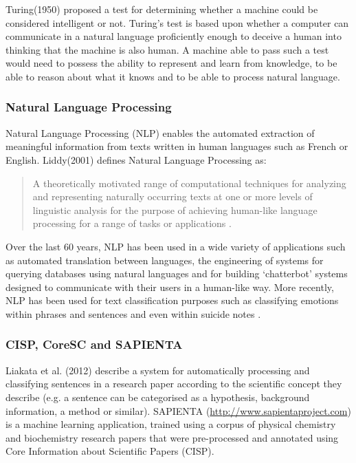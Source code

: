 \documentclass[12pt,a4paper]{article}
\begin{document}
Turing(1950) proposed a test for determining whether a machine could be
considered intelligent or not\cite{turing1950computing}. Turing's test is based
upon whether a computer can communicate in a natural language proficiently
enough to deceive a human into thinking that the machine is also human. A
machine able to pass such a test would need to possess the ability to represent
and learn from knowledge, to be able to reason about what it knows and to be
able to process natural language\cite{russell2010artificial}. 

\subsubsection{Natural Language Processing}

Natural Language Processing (NLP)  enables the automated extraction of
meaningful information from texts written in human languages such as French or
English. Liddy(2001) defines Natural Language Processing as:

\begin{quotation} 
A theoretically motivated range of computational techniques for analyzing and
representing naturally occurring texts at one or more levels of linguistic
analysis for the purpose of achieving human-like language processing for a
range of tasks or applications \cite{liddy2001natural}.  
\end{quotation}

Over the last 60 years, NLP has been used in a wide variety of applications
such as automated translation between languages\cite{hutchins2004first}, the
engineering of systems for querying databases using natural languages
\cite{rao2010natural} and for building `chatterbot' systems designed to
communicate with their users in a human-like way\cite{Alfonsi2006}.
More recently, NLP has been used for text classification purposes such as
classifying emotions within phrases and sentences \cite{Wilson05Polarity} and
even within suicide notes \cite{citeulike:11077287}.


\subsubsection{CISP, CoreSC and SAPIENTA}

Liakata et al. (2012) describe a system for automatically processing and
classifying sentences in a research paper according to the scientific concept
they describe (e.g. a sentence can be categorised as a hypothesis, background
information, a method or similar)\cite{citeulike:10444769}. SAPIENTA
(\url{http://www.sapientaproject.com}) is a machine learning application,
trained using a corpus of physical chemistry and biochemistry research papers
that were pre-processed and annotated using Core Information about Scientific
Papers (CISP)\cite{LIAKATA10.644}. 
\end{document}

